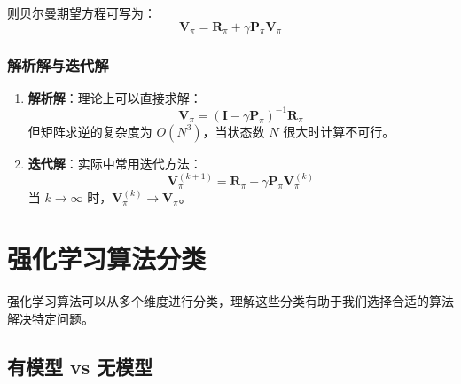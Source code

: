 则贝尔曼期望方程可写为：
\[
\mathbf{V}_\pi = \mathbf{R}_\pi + \gamma \mathbf{P}_\pi \mathbf{V}_\pi
\]

\subsubsection{解析解与迭代解}
\begin{enumerate}
    \item \textbf{解析解}：理论上可以直接求解：
    \[
    \mathbf{V}_\pi = (\mathbf{I} - \gamma \mathbf{P}_\pi)^{-1} \mathbf{R}_\pi
    \]
    但矩阵求逆的复杂度为 $O(N^3)$，当状态数 $N$ 很大时计算不可行。
    
    \item \textbf{迭代解}：实际中常用迭代方法：
    \[
    \mathbf{V}_\pi^{(k+1)} = \mathbf{R}_\pi + \gamma \mathbf{P}_\pi \mathbf{V}_\pi^{(k)}
    \]
    当 $k \to \infty$ 时，$\mathbf{V}_\pi^{(k)} \to \mathbf{V}_\pi$。
\end{enumerate}

\section{强化学习算法分类}

强化学习算法可以从多个维度进行分类，理解这些分类有助于我们选择合适的算法解决特定问题。

\subsection{有模型 vs 无模型}

